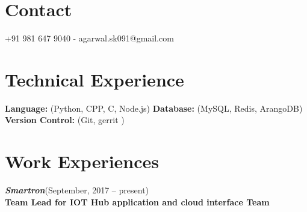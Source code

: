 \documentclass[a4paper,margin,line]{resume}
\begin{document}
\begin{resume}

	\section{\mysidestyle Contact}
	+91 981 647 9040 -  agarwal.sk091@gmail.com\\%

	\section{\mysidestyle Technical Experience}
	\textbf{Language: }(Python, CPP, C, Node.js) \textbf{Database: }(MySQL, Redis, ArangoDB) 
	\\ \textbf{Version Control: }(Git, gerrit )
	

	\section{\mysidestyle Work Experiences}
	\textsl{\textbf{Smartron}}\hfill(September, 2017 -- present)\vspace{1mm}\\%
	\textbf{Team Lead for IOT Hub application and cloud interface Team}\vspace{0.5mm}\\%


\end{resume}
\end{document}
